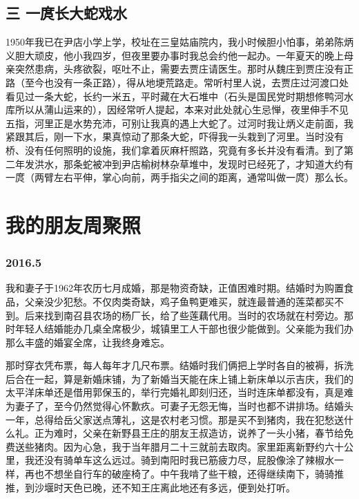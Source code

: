 \subsection*{三 一庹长大蛇戏水}

1950年我已在尹店小学上学，校址在三皇姑庙院内，我小时候胆小怕事，弟弟陈炳义胆大顽皮，他小我四岁，但夜里要办事时我总会约他一起办。一年夏天的晚上母亲突然患病，头疼欲裂，呕吐不止，需要去贾庄请医生。那时从魏庄到贾庄没有正路（至今也没有一条正路），得从地埂荒路走。常听村里人说，去贾庄过河渡口处看见过一条大蛇，长约一米五，平时藏在大石堆中（石头是国民党时期想修鸭河水库所以从蒲山运来的），因经常听人提起，本来对此处就心生忌惮，夜里伸手不见五指，河里正是水势充沛，可别让我真的遇上大蛇了。过河时我让炳义走前面，我紧跟其后，刚一下水，果真惊动了那条大蛇，吓得我一头栽到了河里。当时没有桥、没有任何照明的设施，我们拿着灰麻杆照路，究竟有多长并没有看清。到了第二年发洪水，那条蛇被冲到尹店榆树林杂草堆中，发现时已经死了，才知道大约有一庹（两臂左右平伸，掌心向前，两手指尖之间的距离，通常叫做一庹）那么长。


\section*{我的朋友周聚照}


\subsubsection*{2016.5}

我和妻子于1962年农历七月成婚，那是物资奇缺，正值困难时期。结婚时为购置食品，父亲没少犯愁。不仅肉类奇缺，鸡子鱼鸭更难买，就连最普通的莲菜都买不到。后来找到南召县农场的杨厂长，给了些莲藕代用。当时的农场就在村旁边。那时年轻人结婚能办几桌全席极少，城镇里工人干部也很少能做到。父亲能为我们办那么丰盛的婚宴全席，让我终身难忘。

那时穿衣凭布票，每人每年才几尺布票。结婚时我们俩把上学时各自的被褥，拆洗后合在一起，算是新婚床铺，为了新婚当天能在床上铺上新床单以示吉庆，我们的太平洋床单还是借用郭保玉的，举行完婚礼即刻归还，当时连床单都没有，真是难为妻子了，至今仍然觉得心怀歉疚。可妻子无怨无悔，当时也都不讲排场。结婚头一年，总得给岳父家送点薄礼，这是农村老习惯。那是买不到猪肉，我在犯愁送什么礼。正为难时，父亲在新野县王庄的朋友王叔造访，说养了一头小猪，春节给免费送些猪肉。因为心急，我于当年腊月二十三就前去取肉。家里距离新野约六十公里，我还没有骑单车这么远过。骑到南阳时我已筋疲力尽，屁股像涂了辣椒水一样，再也不想坐自行车的破座椅了。中午我啃了些干粮，还得继续南下，骑骑推推，到沙堰时天色已晚，还不知王庄离此地还有多远，便到处打听。

